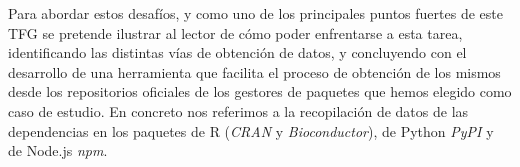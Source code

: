 Para abordar estos desafíos, y como uno de los principales puntos fuertes de este TFG se pretende ilustrar al 
lector de cómo poder enfrentarse a esta tarea, identificando las distintas vías de obtención de datos, y concluyendo 
con el desarrollo de una herramienta que facilita el proceso de obtención de los mismos desde los repositorios
oficiales de los gestores de paquetes que hemos elegido como caso de estudio.  En concreto nos referimos a la 
recopilación de datos de las dependencias en los paquetes de R (\textit{CRAN} y \textit{Bioconductor}), de Python \textit{PyPI} y de Node.js \textit{npm}.
